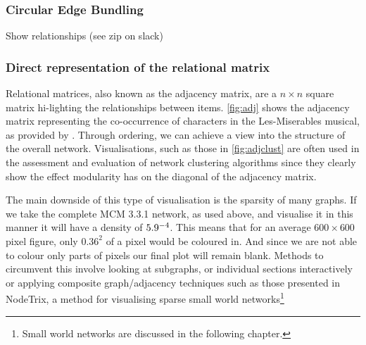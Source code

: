 \subsubsection{Circular Edge Bundling}

Show relationships (see zip on slack)






\subsubsection{Direct representation of the relational matrix}
Relational matrices, also known as the adjacency matrix, are a $n \times n$ square matrix hi-lighting the relationships between items. \autoref{fig:adj} shows the adjacency matrix representing the co-occurrence of characters in the Les-Miserables musical, as provided by \citep{lesmis}. Through ordering, we can achieve a view into the structure of the overall network. Visualisations, such as those in \autoref{fig:adjclust} are often used in the assessment and evaluation of network clustering algorithms since they clearly show the effect modularity has on the diagonal of the adjacency matrix.


The main downside of this type of visualisation is the sparsity of many graphs. If we take the complete MCM 3.3.1 network, as used above, and visualise it in this manner it will have a density of $5.9 \time 10^{-4}$. This means that for an average $600 \times 600$ pixel figure, only $0.36^2$ of a pixel would be coloured in. And since we are not able to colour only parts of pixels our final plot will remain blank. Methods to circumvent this involve looking at subgraphs, or individual sections interactively or applying composite graph/adjacency techniques such as those presented in NodeTrix, a method for visualising sparse small world networks\footnote{Small world networks are discussed in the following chapter.} \citep{nodetrix}

